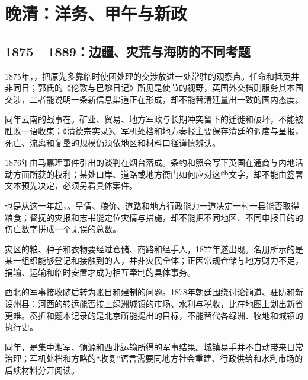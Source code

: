 \chapter{晚清：洋务、甲午与新政}
\label{ch:late-qing-reform}



\section{1875—1889：边疆、灾荒与海防的不同考题}

1875年，，把原先多靠临时使团处理的交涉放进一处常驻的观察点。任命和抵英并非同日；郭氏的《伦敦与巴黎日记》所见是使节的视野，英国外交档则服务其本国交涉，二者能说明一条新信息渠道正在形成，却不能替清廷量出一致的国内态度。

同年云南的战事在。矿业、贸易、地方军政与长期冲突留下的迁徙和破坏，不能被胜败一语收束；《清德宗实录》、军机处档和地方奏报主要保存清廷的调度与呈报，死亡、流离和复垦的规模仍须依地区和材料口径谨慎辨认。


1876年由马嘉理事件引出的谈判在烟台落成。条约和照会写下英国在通商与内地活动方面所获的权利；某处口岸、道路或地方衙门如何应对这些文字，却不能由签署文本预先决定，必须另看具体案件。


也是从这一年起，。旱情、粮价、道路和地方行政能力一道决定一村一县能否取得粮食；督抚的灾报和志书能定位灾情与措施，却不能把不同地区、不同申报目的的伤亡数字拼成一个无误的总数。


灾区的粮、种子和衣物要经过仓储、商路和经手人，1877年遂出现。名册所示的是某一组织能够登记和接触到的人，并非灾民全体；正因常规仓储与地方财力不足，捐输、运输和临时安置才成为相互牵制的具体事务。

西北的军事接收随后转为账目和建制的问题。1878年朝廷围绕讨论饷道、驻防和新设州县：河西的转运能否接上绿洲城镇的市场、水利与税收，比在地图上划出新省更难。奏折和题本记录的是北京所能提出的目标，不能替代各绿洲、牧地和城镇的执行史。


同年，是集中湘军、饷源和西北运输所得的军事结果。城镇易手并不自动带来日常治理；军机处档和方略的“收复”语言需要同地方社会重建、行政供给和水利市场的后续材料分开阅读。


